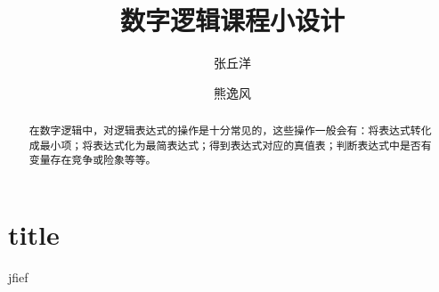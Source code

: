 \documentclass{ctexrep}
\author{张丘洋\and 熊逸风}
\title{数字逻辑课程小设计}
\begin{document}
    \maketitle
    \tableofcontents

    \begin{abstract}
        在数字逻辑中，对逻辑表达式的操作是十分常见的，这些操作一般会有：将表达式转化成最小项；将表达式化为最简表达式；得到表达式对应的真值表；判断表达式中是否有变量存在竞争或险象等等。
    \end{abstract}

    \chapter{title}
        jfief
\end{document}
